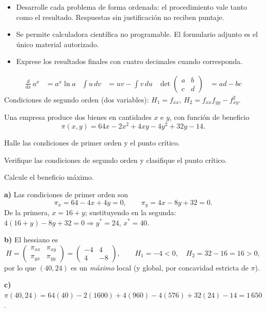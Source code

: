 \documentclass{evaluacion}
\begin{document}
\membrete

\begin{instrucciones}
\begin{itemize}
  \item Desarrolle cada problema de forma ordenada: el procedimiento vale
        tanto como el resultado. Respuestas sin justificación no reciben
        puntaje.
  \item Se permite calculadora científica no programable. El formulario
        adjunto es el único material autorizado.
  \item Exprese los resultados finales con cuatro decimales cuando
        corresponda.
\end{itemize}
\end{instrucciones}


\begin{formulario}
\begin{align*}
  \frac{d}{dx}\,a^{x} &= a^{x}\ln a
  &\int u\,dv &= uv-\int v\,du
  &\det\!\begin{pmatrix} a & b\\ c & d\end{pmatrix} &= ad-bc
\end{align*}
Condiciones de segundo orden (dos variables): $H_1=f_{xx}$,\quad
$H_2=f_{xx}f_{yy}-f_{xy}^{2}$.
\end{formulario}

\begin{pregunta}[5][Optimización]
Una empresa produce dos bienes en cantidades $x$ e $y$, con función de
beneficio
\[
  \pi(x,y) = 64x - 2x^{2} + 4xy - 4y^{2} + 32y - 14.
\]
\begin{apartados}
  \item Halle las condiciones de primer orden y el punto crítico. 
  \item Verifique las condiciones de segundo orden y clasifique el punto
        crítico. 
  \item Calcule el beneficio máximo. 
\end{apartados}
\espaciorespuesta{8cm}
\begin{solucion}
\textbf{a)} Las condiciones de primer orden son
\[
  \pi_x = 64 - 4x + 4y = 0, \qquad
  \pi_y = 4x - 8y + 32 = 0.
\]
De la primera, $x = 16 + y$; sustituyendo en la segunda:
$4(16+y) - 8y + 32 = 0 \Rightarrow y^{*} = 24$, $x^{*} = 40$.

\textbf{b)} El hessiano es
\[
  H = \begin{pmatrix} \pi_{xx} & \pi_{xy}\\ \pi_{yx} & \pi_{yy}\end{pmatrix}
    = \begin{pmatrix} -4 & 4\\ 4 & -8\end{pmatrix},
  \qquad H_1 = -4 < 0,\quad H_2 = 32-16 = 16 > 0,
\]
por lo que $(40,24)$ es un \emph{máximo} local (y global, por concavidad
estricta de $\pi$).

\textbf{c)} $\pi(40,24) = 64(40) - 2(1600) + 4(960) - 4(576) + 32(24) - 14
= 1\,650$.
\end{solucion}
\end{pregunta}
\end{document}
